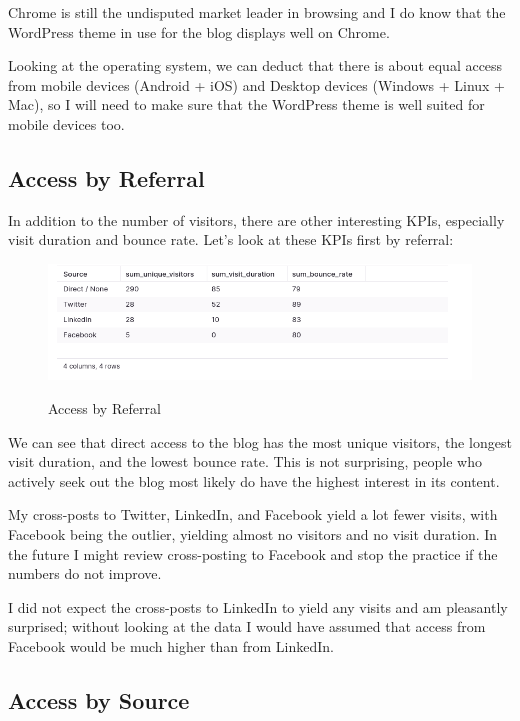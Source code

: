 Chrome is still the undisputed market leader in browsing and I do know that the WordPress theme in use for the blog displays well on Chrome. 

Looking at the operating system, we can deduct that there is about equal access from mobile devices (Android + iOS) and Desktop devices (Windows + Linux + Mac), so I will need to make sure that the WordPress theme is well suited for mobile devices too.

\subsection{Access by Referral}

In addition to the number of visitors, there are other interesting KPIs, especially visit duration and bounce rate. Let's look at these KPIs first by referral:

\begin{figure}[H]
\centering
\caption {Access by Referral}
\includegraphics[width=\linewidth]{images/access-referral.png}
\label{fig:accessReferral}
\end{figure}

We can see that direct access to the blog has the most unique visitors, the longest visit duration, and the lowest bounce rate. This is not surprising, people who actively seek out the blog most likely do have the highest interest in its content.

My cross-posts to Twitter, LinkedIn, and Facebook yield a lot fewer visits, with Facebook being the outlier, yielding almost no visitors and no visit duration. In the future I might review cross-posting to Facebook and stop the practice if the numbers do not improve. 

I did not expect the cross-posts to LinkedIn to yield any visits and am pleasantly surprised; without looking at the data I would have assumed that access from Facebook would be much higher than from LinkedIn.

\subsection{Access by Source}

